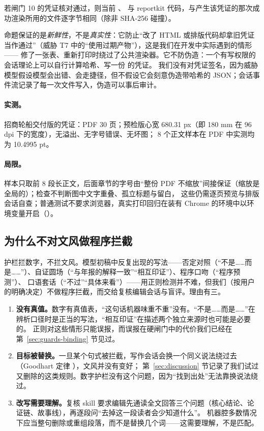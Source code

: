 \begin{proposition}[凭证的新鲜性]
\label{prop:guards-fresh}
若闸门 10 的凭证核对通过，则当前 、 与 reportkit 代码，与产生该凭证的那次成功渲染所用的文件逐字节相同（除非 SHA-256 碰撞）。
\end{proposition}

命题保证的是\emph{新鲜性}，不是\emph{真实性}：它防止“改了 HTML 或排版代码却拿旧凭证当作通过”（威胁 T7 中的“使用过期产物”），这是我们在开发中实际遇到的情形——
修了一张表、重新打印时绕过了公共渲染器。它不防伪造：一个有写权限的会话理论上可以自行计算哈希、写一份  的凭证。
我们没有对凭证签名，因为威胁模型假设模型会出错、会走捷径，但不假设它会刻意伪造带哈希的 JSON；会话事件流记录了每一次文件写入，伪造可以事后审计。

\paragraph{实测。}招商轮船交付版的凭证：PDF 30 页；预检版心宽 680.31 px（即 180 mm 在 96 dpi 下的宽度），无溢出、无字号错误、无坏图；
8 个正文样本在 PDF 中实测均为 10.4995 pt。

\paragraph{局限。}样本只取前 8 段长正文，后面章节的字号由“整份 PDF 不缩放”间接保证（缩放是全局的）；检查不判断图中文字重叠、孤立标题与留白，
这些仍需逐页预览与排版会话自查；普通测试不要求浏览器，真实打印回归在装有 Chrome 的环境中以环境变量开启（）。

\subsection{为什么不对文风做程序拦截}
\label{sec:guards-style}

护栏拦数字，不拦文风。模型初稿中反复出现的写法——否定对照（“不是……而是……”）、自证圆场（“与年报的解释一致”“相互印证”）、程序口吻（“程序预测”）、
口语套话（“不过”“具体来看”）——用正则检测并不难，但我们（按用户的明确决定）不做程序拦截，而交给复核编辑会话与盲评。理由有三。

\begin{enumerate}
\item \textbf{没有真值。}数字有真值表，“这句话机器味重不重”没有。“不是……而是……”在辨析口径时是正当的写法，“相互印证”在描述两个独立来源时也可能是必要的。
  正则对这些情形只能误报，而误报在硬闸门中的代价我们已经在第~\ref{sec:guards-binding} 节见过。
\item \textbf{目标被替换。}一旦某个句式被拦截，写作会话会换一个同义说法绕过去（Goodhart 定律 \citep{goodhart1984problems}），文风并没有变好；
  第~\ref{sec:discussion} 节记录了我们试过又删除的这类规则。数字护栏没有这个问题，因为“找到出处”无法靠换说法绕过。
\item \textbf{改写需要理解。}复核 skill 要求编辑先通读全文回答三个问题（核心结论、论证链、故事线），再逐段问“去掉这一段读者会少知道什么”。
  机器腔多数情况下应当整句删除或重组段落，而不是替换几个词——这需要理解，不是匹配。
\end{enumerate}

